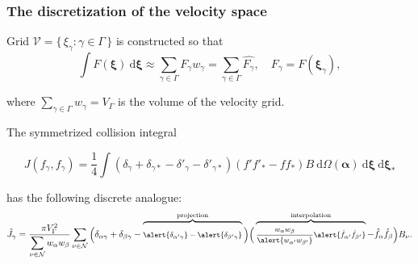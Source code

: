 \documentclass[mathserif]{beamer} %
\newcommand{\dd}{\:\mathrm{d}}
\newcommand{\dxi}{\boldsymbol{\dd\xi}}
\newcommand{\bxi}{\boldsymbol{\xi}}
\newcommand{\Nu}{\mathcal{N}}
\newcommand{\Set}[2]{\{\,{#1}:{#2}\,\}}
\newcommand{\xoverbrace}[2][\vphantom{\int}]{\overbrace{#1#2}}
\begin{document}
\begin{frame}
    \frametitle{The discretization of the velocity space}
    Grid \(\mathcal{V} = \Set{\xi_\gamma}{\gamma\in\Gamma}\) is constructed so that
    \begin{equation}\label{eq:xi_cubature}
        \int F(\bxi) \dxi \approx \sum_{\gamma\in\Gamma} F_\gamma w_\gamma =
            \sum_{\gamma\in\Gamma} \hat{F_\gamma},
            \quad F_\gamma = F(\bxi_\gamma),
    \end{equation}\vspace{-10pt}

    where \(\sum_{\gamma\in\Gamma} w_\gamma = V_\Gamma\) is the volume of the velocity grid.
    \pause\vspace{20pt}

    The symmetrized collision integral\vspace{-20pt}

    \begin{equation}\label{eq:symm_ci}
        J(f_\gamma, f_\gamma) = \frac14\int \left(
            \delta_\gamma + \delta_{\gamma*} - \delta'_\gamma - \delta'_{\gamma*}
        \right) (f'f'_* - ff_*)B \dd\Omega(\boldsymbol{\alpha}) \dxi\dxi_*
    \end{equation}\vspace{-30pt}

    has the following discrete analogue: %
    \begin{equation}\label{eq:discrete_symm_ci}
        \footnotesize
        \hat{J}_\gamma = \frac{\pi V_\Gamma^2}{\displaystyle\sum_{\nu\in\Nu} w_{\alpha}w_{\beta}}
            \sum_{\nu\in\Nu} \bigg(
                \delta_{\alpha\gamma} + \delta_{\beta\gamma} -
                \xoverbrace{ \alert{\delta_{\alpha'\gamma}} - \alert{\delta_{\beta'\gamma}} }^\text{projection}
            \bigg)\bigg(
                \xoverbrace{ \frac{w_{\alpha}w_{\beta}}{\alert{w_{\alpha'}w_{\beta'}}}
                \alert{\hat{f}_{\alpha'}\hat{f}_{\beta'}} }^\text{interpolation} - \hat{f}_{\alpha}\hat{f}_{\beta}
            \bigg)B_\nu.
    \end{equation}\vspace{-10pt}
\end{frame}
\end{document}
